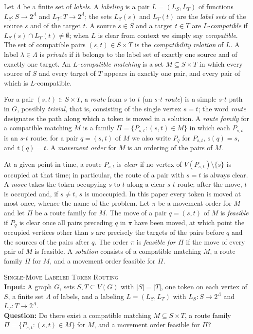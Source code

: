 \documentclass[a4paper,USenglish,thm-restate]{lipics-v2021}
\newcommand{\src}{\mathrm{s}}
\newcommand{\tgt}{\mathrm{t}}
\theoremstyle{problemstyle}
\begin{document}
Let $\Lambda$ be a finite set of \emph{labels}. A \emph{labeling} is a pair
$L=(L_S,L_T)$ of functions $L_S\colon S\to 2^{\Lambda}$ and
$L_T\colon T\to 2^{\Lambda}$; the sets $L_S(s)$ and $L_T(t)$ are the \emph{label
sets} of the source $s$ and of the target $t$.
A source $s\in S$ and a target $t\in T$ are \emph{$L$-compatible} if
$L_S(s)\cap L_T(t)\neq\emptyset$; when $L$ is clear from context we simply say
\emph{compatible}. The set of compatible pairs $(s,t)\in S\times T$ is the
\emph{compatibility relation} of $L$. A label $\lambda\in\Lambda$ is \emph{private} if it belongs to the
label set of exactly one source and of exactly one target. An
\emph{$L$-compatible matching} is a set $M\subseteq S\times T$ in which every
source of $S$ and every target of $T$ appears in exactly one pair, and every
pair of which is $L$-compatible.

For a pair $(s,t)\in S\times T$, a \emph{route} from $s$ to $t$ (an \emph{$s$-$t$
route}) is a simple $s$-$t$ path in $G$, possibly \emph{trivial}, that is,
consisting of the single vertex $s=t$; the word
\emph{route} designates the path along which a token is moved in a
solution. A \emph{route
family} for a compatible matching $M$ is a family
$\Pi=\{P_{s,t}:(s,t)\in M\}$ in which each $P_{s,t}$ is an $s$-$t$ route; for a
pair $q=(s,t)$ of $M$ we also write $P_q$ for $P_{s,t}$, $\src(q)=s$, and
$\tgt(q)=t$. A \emph{movement
order} for $M$ is an ordering of the pairs of $M$.

At a given point in time, a route $P_{s,t}$ is \emph{clear} if no vertex of
$V(P_{s,t})\setminus\{s\}$ is occupied at that time; in particular, the
route of a pair with $s=t$ is always clear. A \emph{move} takes the
token occupying $s$ to $t$ along a clear $s$-$t$ route; after the move, $t$ is
occupied and, if $s\neq t$, $s$ is unoccupied. In
this paper every token is moved at most once, whence the name of the problem.
Let $\pi$ be a movement order for $M$ and let $\Pi$ be a route family for $M$.
The move of a pair $q=(s,t)$ of $M$ is \emph{feasible} if $P_q$ is clear once
all pairs preceding $q$ in $\pi$ have been moved, at which point the occupied
vertices other than $s$ are precisely the targets of the pairs before $q$ and
the sources of the pairs after $q$. The order $\pi$ is \emph{feasible for
$\Pi$} if the move of every pair of $M$ is feasible. A \emph{solution} consists of a compatible matching
$M$, a route family $\Pi$ for $M$, and a movement order feasible for $\Pi$.

\begin{tcolorbox}[colback=white, colframe=black, arc=2mm, boxrule=0.3mm,
  left=2mm, right=2mm, top=1mm, bottom=1mm]
\textsc{Single-Move Labeled Token Routing}\\[0.5ex]
\textbf{Input:} A graph $G$, sets $S,T\subseteq V(G)$ with $|S|=|T|$, one token on each vertex of $S$, a finite
set $\Lambda$ of labels, and a labeling $L=(L_S,L_T)$ with
$L_S\colon S\to 2^{\Lambda}$ and $L_T\colon T\to 2^{\Lambda}$.\\[0.5ex]
\textbf{Question:} Do there exist a compatible matching
$M\subseteq S\times T$, a route family $\Pi=\{P_{s,t}:(s,t)\in M\}$ for $M$, and
a movement order feasible for $\Pi$?
\end{tcolorbox}
\end{document}
